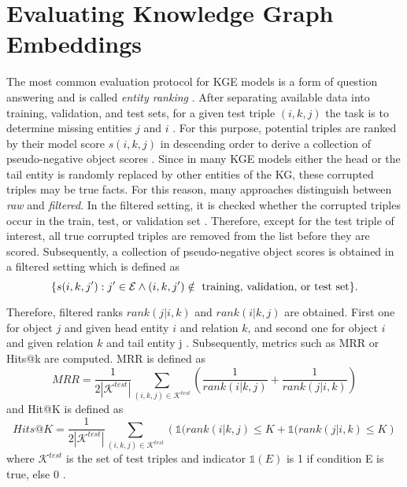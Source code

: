 \section{Evaluating Knowledge Graph Embeddings} 
\label{sec:evaluating_knowledge_graph_embeddings}
%
The most common evaluation protocol for \ac{KGE} models is a form of question answering and is called \textit{entity ranking} \cite{Ruffinelli2020You}.
After separating available data into training, validation, and test sets, for a given test triple $(i,k,j)$ the task is to determine missing entities $j$ and $i$ \cite{Ruffinelli2020You}.
For this purpose, potential triples are ranked by their model score $s(i, k, j)$ in descending order to derive a collection of pseudo-negative object scores \cite{Ruffinelli2020You}.
Since in many \ac{KGE} models either the head or the tail entity is randomly replaced by other entities of the \ac{KG}, these corrupted triples may be true facts.
For this reason, many approaches distinguish between \textit{raw} and \textit{filtered}.
In the filtered setting, it is checked whether the corrupted triples occur in the train, test, or validation set \cite{TransE}.
Therefore, except for the test triple of interest, all true corrupted triples are removed from the list before they are scored.
Subsequently, a collection of pseudo-negative object scores is obtained in a filtered setting  which is defined as \cite{Ruffinelli2020You}
$$\{ s(i, k, j') : j' \in \mathcal{E} \wedge (i, k, j') \notin \text{ training, validation, or test set}\}.$$

Therefore, filtered ranks $rank(j|i, k)$ and $rank(i|k, j)$ are obtained.
First one for object $j$ and given head entity $i$ and relation $k$, 
and second one for object $i$ and given relation $k$ and tail entity j \cite{Ruffinelli2020You}.
Subsequently, metrics such as \ac{MRR} or Hits@k are computed.
MRR is defined as \cite{Ruffinelli2020You}
\begin{equation}
    MRR = \frac{1}{2 |\mathcal{K}^{test}|} \sum_{(i,k,j) \in  \mathcal{K}^{test}} \left( \frac{1}{rank(i |k,j)} + \frac{1}{rank(j|i,k)} \right)
\end{equation}
and Hit@K is defined as \cite{Ruffinelli2020You}
\begin{equation}
    Hits@K = \frac{1}{2|\mathcal{K}^{test}|} \sum_{(i,k,j) \in  \mathcal{K}^{test}} \left( \mathds{1} (rank(i |k,j) \leq K + \mathds{1}  (rank(j|i,k) \leq K \right)
\end{equation}
where $\mathcal{K}^{test}$ is the set of test triples and indicator $\mathds{1}(E)$ is 1 if condition E is true, else 0 \cite{Ruffinelli2020You}.